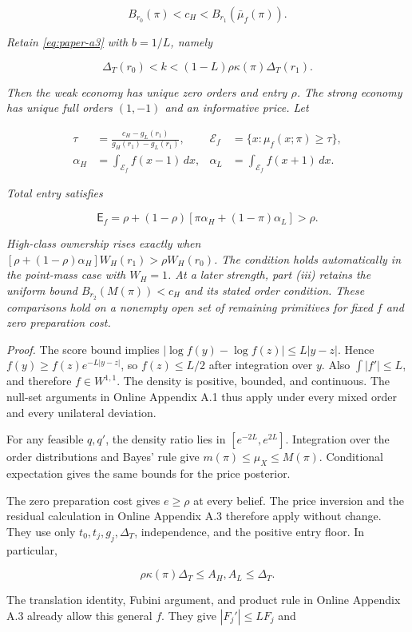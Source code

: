 \[
B_{r_0}(\pi)<c_H<B_{r_1}(\bar\mu_f(\pi)).
\]

\emph{Retain \eqref{eq:paper-a3} with \(b=1/L\), namely}

\[
\Delta_T(r_0)<k<(1-L)\rho\kappa(\pi)\Delta_T(r_1).
\]

\emph{Then the weak economy has unique zero orders and entry \(\rho\).
The strong economy has unique full orders \((1,-1)\) and an informative price.
Let}

\[
\begin{aligned}
\tau&=\frac{c_H-g_L(r_1)}{g_H(r_1)-g_L(r_1)},
&\mathcal E_f&=\{x:\mu_f(x;\pi)\ge\tau\},\\
\alpha_H&=\int_{\mathcal E_f}f(x-1)\,dx,
&\alpha_L&=\int_{\mathcal E_f}f(x+1)\,dx.
\end{aligned}
\]

\emph{Total entry satisfies}

\[
\mathsf E_f=\rho+(1-\rho)[\pi\alpha_H+(1-\pi)\alpha_L]>\rho.
\]

\emph{High-class ownership rises exactly when
\([\rho+(1-\rho)\alpha_H]W_H(r_1)>\rho W_H(r_0)\).
The condition holds automatically in the point-mass case with \(W_H=1\).
At a later strength, part (iii) retains the uniform bound
\(B_{r_2}(M(\pi))<c_H\) and its stated order condition.
These comparisons hold on a nonempty open set of remaining primitives for fixed \(f\) and zero preparation cost.}

\emph{Proof.}
The score bound implies
\(|\log f(y)-\log f(z)|\le L|y-z|\).
Hence \(f(y)\ge f(z)e^{-L|y-z|}\), so \(f(z)\le L/2\) after integration over \(y\).
Also \(\int|f'|\le L\), and therefore \(f\in W^{1,1}\).
The density is positive, bounded, and continuous.
The null-set arguments in Online Appendix A.1 thus apply under every mixed order and every unilateral deviation.
\par
For any feasible \(q,q'\), the density ratio lies in \([e^{-2L},e^{2L}]\).
Integration over the order distributions and Bayes' rule give
\(m(\pi)\le\mu_X\le M(\pi)\).
Conditional expectation gives the same bounds for the price posterior.

The zero preparation cost gives \(e\ge\rho\) at every belief.
The price inversion and the residual calculation in Online Appendix A.3 therefore apply without change.
They use only \(t_0,t_j,g_j,\Delta_T\), independence, and the positive entry floor.
In particular,

\[
\rho\kappa(\pi)\Delta_T\le A_H,A_L\le\Delta_T.
\]

The translation identity, Fubini argument, and product rule in Online Appendix A.3 already allow this general \(f\).
They give \(|F_j'|\le LF_j\) and

